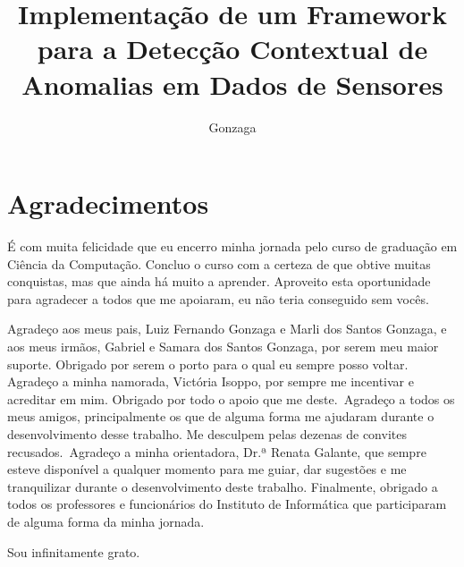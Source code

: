 \documentclass[cic,tc]{iiufrgs}
\title{Implementação de um Framework para a Detecção Contextual de Anomalias em Dados de Sensores}
\author{Gonzaga}{Matheus dos Santos}
\begin{document}
\maketitle


\chapter*{Agradecimentos}
É com muita felicidade que eu encerro minha jornada pelo curso de graduação em Ciência da Computação. Concluo o curso com a certeza de que obtive muitas conquistas, mas que ainda há muito a aprender. Aproveito esta oportunidade para agradecer a todos que me apoiaram, eu não teria conseguido sem vocês.

Agradeço aos meus pais, Luiz Fernando Gonzaga e Marli dos Santos Gonzaga, e aos meus irmãos, Gabriel e Samara dos Santos Gonzaga, por serem meu maior suporte. Obrigado por serem o porto para o qual eu sempre posso voltar. Agradeço a minha namorada, Victória Isoppo, por sempre me incentivar e acreditar em mim. Obrigado por todo o apoio que me deste.~Agradeço a todos os meus amigos, principalmente os que de alguma forma me ajudaram durante o desenvolvimento desse trabalho. Me desculpem pelas dezenas de convites recusados.~Agradeço a minha orientadora, Dr.ª Renata Galante, que sempre esteve disponível a qualquer momento para me guiar, dar sugestões e me tranquilizar durante o desenvolvimento deste trabalho. Finalmente, obrigado a todos os professores e funcionários do Instituto de Informática que participaram de alguma forma da minha jornada.

Sou infinitamente grato.
\end{document}
